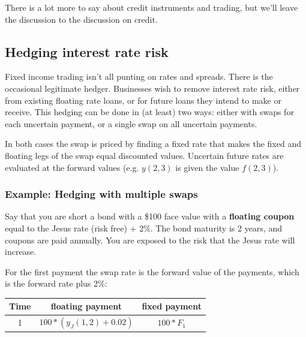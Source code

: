 There is a lot more to say about  credit instruments and trading, but we'll leave the discussion to the discussion on credit.

\subsection{Hedging interest rate risk}

Fixed income trading isn't all punting on rates and spreads. There is the occasional legitimate hedger. Businesses wish to remove interest rate risk, either from existing floating rate loans, or for future loans they intend to make or receive. This hedging can be done in (at least) two ways: either with swaps for each uncertain payment, or a single swap on all uncertain payments.

In both cases the swap is priced by finding  a fixed rate that makes the fixed and floating legs of the swap equal discounted values. Uncertain future rates are evaluated at the forward values (e.g. $y(2,3)$ is given the value $f(2,3)$).


\subsubsection*{Example: Hedging with multiple swaps}
Say that you are short a bond with a \$100 face value with a \textbf{floating coupon} equal to the Jesus rate (risk free) + 2\%. The bond maturity is 2 years, and coupons are paid annually. You are exposed to the risk that the Jesus rate will increase. 

For the first payment the swap rate is the forward value of the payments, which is the forward rate plus 2\%:

\begin{center}
\begin{tabular}{|ccc|}
\hline
Time & floating payment & fixed payment\\
\hline
1 & $100*(y_J(1,2)+0.02)$ &  $100*F_1$\\
\hline
\end{tabular}
\end{center}

